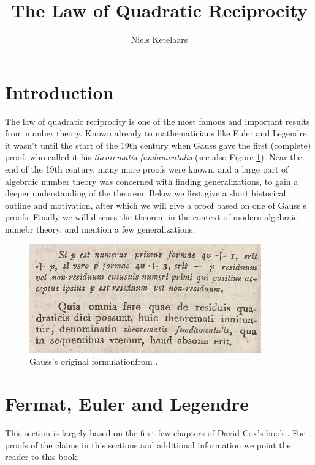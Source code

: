 \documentclass[11pt]{amsart}
\title{The Law of Quadratic Reciprocity}
\author{Niels Ketelaars}
\begin{document}
\maketitle
\section{Introduction}
{\hypersetup{linkcolor = black}

  The law of quadratic reciprocity is one of the most famous and important results from number theory. Known already to mathematicians like Euler and Legendre, it wasn't until the start of the 19th century when Gauss gave the first (complete) proof, who called it his \emph{theorematis fundamentalis} (see also Figure \ref{fig:gauss}). Near the end of the 19th century, many more proofs were known, and a large part of algebraic number theory was concerned with finding generalizations, to gain a deeper understanding of the theorem.
  Below we first give a short historical outline and motivation, after which we will give a proof based on one of Gauss's proofs. Finally we will discuss the theorem in the context of modern algebraic numebr theory, and mention a few generalizations. 
\begin{figure}[H]
\centering
\label{fig:gauss}
\includegraphics[width=10cm]{gauss.png}
\caption{Gauss's original formulation\protect\footnotemark from \cite{cfg}.}
\end{figure}

}

\section{Fermat, Euler and Legendre}
This section is largely based on the first few chapters of David Cox's book \cite{cox}. For proofs of the claims in this sections and additional information we point the reader to this book.
\end{document}
